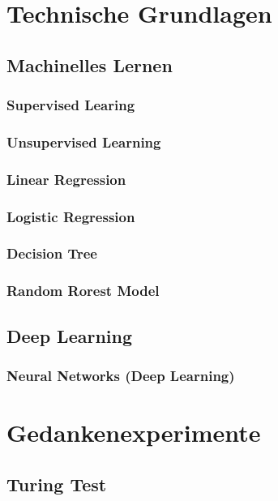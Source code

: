 \documentclass[12pt]{report}
\begin{document}
    \chapter{Technische Grundlagen}

    \section{Machinelles Lernen}
    \subsection{Supervised Learing}
    \subsection{Unsupervised Learning}
    \subsection{Linear Regression}
    \subsection{Logistic Regression}
    \subsection{Decision Tree}
    \subsection{Random Rorest Model}

    \section{Deep Learning}
    \subsection{Neural Networks (Deep Learning)}

    \chapter{Gedankenexperimente}


    \section{Turing Test}
\end{document}
